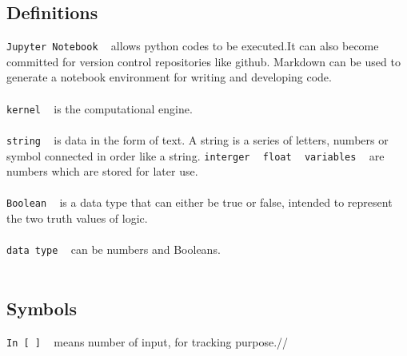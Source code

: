 \documentclass{article}
\begin{document}
\subsection{\textbf{Definitions}}
\texttt{Jupyter Notebook} ~ allows python codes to be executed.It can also become committed for version control repositories like github. Markdown can be used to generate a notebook environment for writing and developing code. \\
\\
\texttt{kernel} ~ is the computational engine. \\ 
\\
\texttt{string} ~ is data in the form of text. A string is a series of letters, numbers or symbol connected in order like a string.
\texttt{interger} ~ 
\texttt{float} ~
\texttt{variables} ~ are numbers which are stored for later use. \\
\\
\texttt{Boolean} ~ is a data type that can either be true or false, intended to represent the two truth values of logic. \\
\\
\texttt{data type} ~ can be numbers and Booleans.\\
\\
\subsection{\textbf{Symbols}}
\texttt{In [~]} ~ means number of input, for tracking purpose.//
\end{document}
